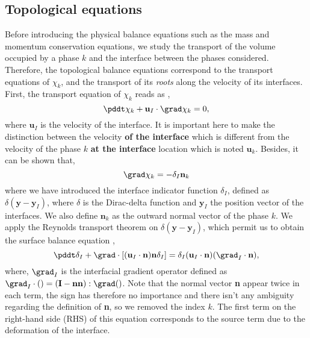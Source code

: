 \subsection{Topological equations}

Before introducing the physical balance equations such as the mass and momentum conservation equations, we study the transport of the volume occupied by a phase $k$ and the interface between the phases considered. 
Therefore, the topological balance equations correspond to the transport equations of $\chi_k$, and the transport of its \textit{roots} along the velocity of its interfaces. 
First, the transport equation of $\chi_k$ reads as \citep{drew1983mathematical,kataoka1986local,morel2015mathematical},
\begin{equation}
    \pddt \chi_k
    + \textbf{u}_I \cdot \grad \chi_k 
    = 0,
    \label{eq:phaseindicator_transport}
\end{equation}
where $\textbf{u}_I$ is the velocity of the interface.
It is important here to make the distinction between the velocity \textbf{of the interface} which is different from the velocity of the phase $k$ \textbf{at the interface} location which is noted $\textbf{u}_k$.
Besides, it can be shown \citep{tryggvason2011direct} that, 
\begin{equation}
    \grad \chi_k 
    = - \delta_I \textbf{n}_k   
\end{equation}
where we have introduced the interface indicator function $\delta_I$, defined as $\delta(\textbf{y}-\textbf{y}_I)$, where $\delta$ is the Dirac-delta function and $\textbf{y}_I$ the position vector of the interfaces. 
We also define $\textbf{n}_k$ as the outward normal vector of the phase $k$. 
We apply the Reynolds transport theorem on $\delta(\textbf{y}-\textbf{y}_I)$, which permit us to obtain the surface balance equation \citep{lhuillier2003dynamics,morel2015mathematical}, 
\begin{equation}
    \pddt \delta_I
    + \grad \cdot\left[
        (\textbf{u}_I\cdot\textbf{n})\textbf{n}\delta_I 
    \right]
    = \delta_I (\textbf{u}_I\cdot\textbf{n})
    (\grad_I\cdot\textbf{n}),
    \label{eq:interface_transport}
\end{equation}
where, $\grad_I$ is the interfacial gradient operator defined as $\grad_I\cdot() = (\textbf{I}-\textbf{nn}):\grad()$.
Note that the normal vector \textbf{n} appear twice in each term, the sign has therefore no importance and there isn't any ambiguity regarding the definition of \textbf{n}, so we removed the index $k$.  
The first term on the right-hand side (RHS) of this equation corresponds to the source term due to the deformation of the interface.
